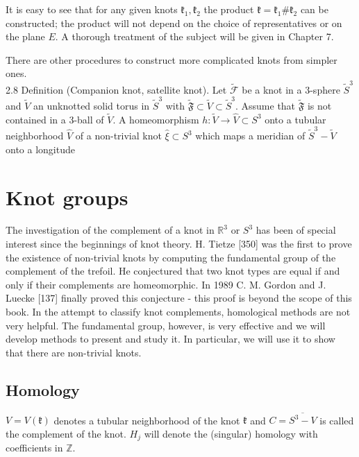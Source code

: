 \documentclass[10pt, letterpaper]{article}
\begin{document}
It is easy to see that for any given knots $\mathfrak{k}_{1}, \mathfrak{k}_{2}$ the product $\mathfrak{k}=\mathfrak{k}_{1} \# \mathfrak{k}_{2}$ can be constructed; the product will not depend on the choice of representatives or on the plane $E$. A thorough treatment of the subject will be given in Chapter 7.

There are other procedures to construct more complicated knots from simpler ones.\\
2.8 Definition (Companion knot, satellite knot). Let $\widetilde{\mathcal{F}}$ be a knot in a 3-sphere $\widetilde{S}^{3}$ and $\widetilde{V}$ an unknotted solid torus in $\widetilde{S}^{3}$ with $\widetilde{\mathfrak{F}} \subset \widetilde{V} \subset \widetilde{S}^{3}$. Assume that $\widetilde{\mathfrak{F}}$ is not contained in a 3-ball of $\widetilde{V}$. A homeomorphism $h: \widetilde{V} \rightarrow \widehat{V} \subset S^{3}$ onto a tubular neighborhood $\widehat{V}$ of a non-trivial knot $\widehat{\xi} \subset S^{3}$ which maps a meridian of $\widetilde{S}^{3}-\widetilde{V}$ onto a longitude



\pagebreak



\section{Knot groups}

The investigation of the complement of a knot in $\mathbb{R}^{3}$ or $S^{3}$ has been of special interest since the beginnings of knot theory. H. Tietze [350] was the first to prove the existence of non-trivial knots by computing the fundamental group of the complement of the trefoil. He conjectured that two knot types are equal if and only if their complements are homeomorphic. In 1989 C. M. Gordon and J. Luecke [137] finally proved this conjecture - this proof is beyond the scope of this book. In the attempt to classify knot complements, homological methods are not very helpful. The fundamental group, however, is very effective and we will develop methods to present and study it. In particular, we will use it to show that there are non-trivial knots.

\subsection{Homology}

$V=V(\mathfrak{k})$ denotes a tubular neighborhood of the knot $\mathfrak{k}$ and $C=\overline{S^{3}-V}$ is called the complement of the knot. $H_{j}$ will denote the (singular) homology with coefficients in $\mathbb{Z}$.
\end{document}
